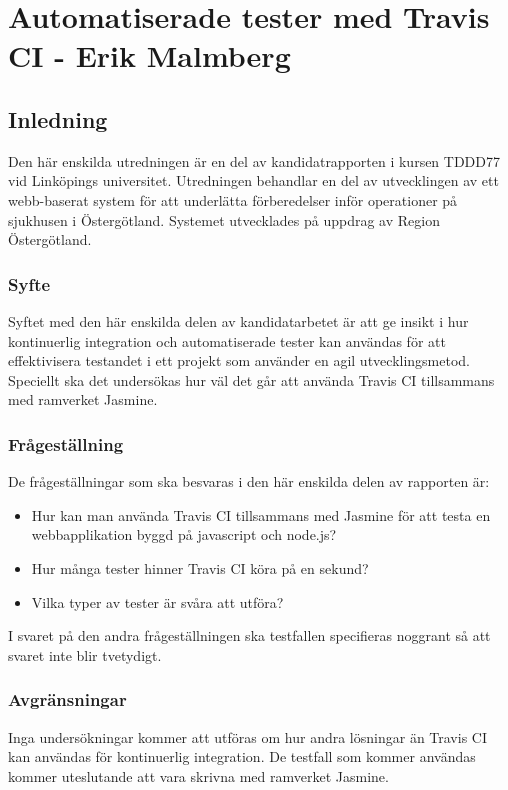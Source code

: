 \section{Automatiserade tester med Travis CI - Erik Malmberg}
\subsection{Inledning}
Den här enskilda utredningen är en del av kandidatrapporten i kursen TDDD77 vid Linköpings universitet.
Utredningen behandlar en del av utvecklingen av ett webb-baserat system för att underlätta förberedelser
inför operationer på sjukhusen i Östergötland. Systemet utvecklades på uppdrag av Region Östergötland.

\subsubsection{Syfte}
Syftet med den här enskilda delen av kandidatarbetet är att ge insikt i hur kontinuerlig integration och 
automatiserade tester kan användas för att effektivisera testandet i ett projekt som använder en agil 
utvecklingsmetod. Speciellt ska det undersökas hur väl det går att använda Travis CI tillsammans med 
ramverket Jasmine.

\subsubsection{Frågeställning}
De frågeställningar som ska besvaras i den här enskilda delen av rapporten är:

\begin{itemize}
\item Hur kan man använda Travis CI tillsammans med Jasmine för att testa en 
webbapplikation byggd på javascript och node.js?
\item Hur många tester hinner Travis CI köra på en sekund?
\item Vilka typer av tester är svåra att utföra?
\end{itemize}

I svaret på den andra frågeställningen ska testfallen specifieras noggrant 
så att svaret inte blir tvetydigt.

\subsubsection{Avgränsningar}
Inga undersökningar kommer att utföras om hur andra lösningar än Travis CI kan användas för kontinuerlig 
integration. De testfall som kommer användas kommer uteslutande att vara skrivna med ramverket Jasmine.

